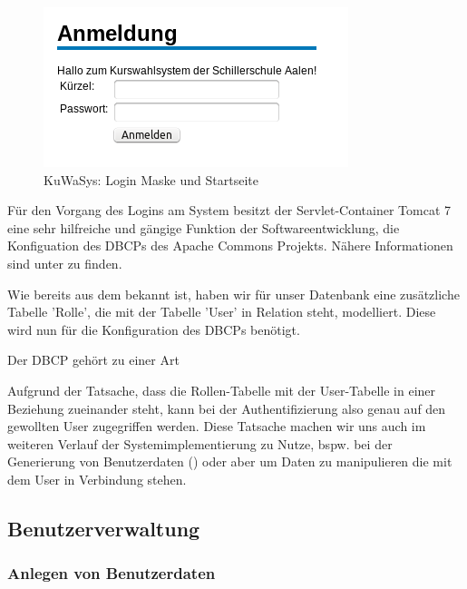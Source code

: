 \documentclass[12pt, twoside, a4paper, ngerman]{article}
\begin{document}
\begin{figure}
 \begin{center}
   \includegraphics[scale=0.7]{img/login_KuWaSys.png}
 \end{center}
 \caption[\textbf{KuWaSys: Login Maske und Startseite}]{KuWaSys: Login Maske und Startseite}
 \label{fig:login_KuWaSys}
\end{figure}


Für den Vorgang des Logins am System besitzt der Servlet-Container Tomcat 7 eine sehr hilfreiche und gängige Funktion der Softwareentwicklung, die Konfiguation des \ac{DBCP}s des Apache Commons Projekts. Nähere Informationen sind unter \cite{ApacheDBCP} zu finden. 

Wie bereits aus dem  bekannt ist, haben wir für unser Datenbank eine zusätzliche Tabelle 'Rolle', die mit der Tabelle 'User' in Relation steht, modelliert. Diese wird nun für die Konfiguration des \ac{DBCP}s benötigt.

Der \ac{DBCP} gehört zu einer Art

Aufgrund der Tatsache, dass die Rollen-Tabelle mit der User-Tabelle in einer Beziehung zueinander steht, kann bei der Authentifizierung also genau auf den gewollten User zugegriffen werden. Diese Tatsache machen wir uns auch im weiteren Verlauf der Systemimplementierung zu Nutze, bspw. bei der Generierung von Benutzerdaten () oder aber um Daten zu manipulieren die mit dem User in Verbindung stehen.

 

\subsection{Benutzerverwaltung}\label{subsec:Daten eines Benutzers}

\subsubsection{Anlegen von Benutzerdaten}
\end{document}
